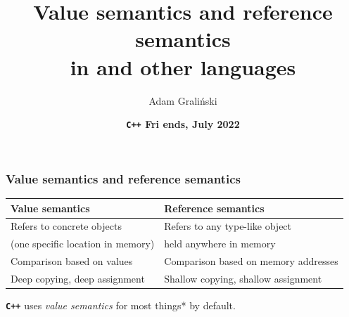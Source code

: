 \documentclass[aspectratio=169]{beamer}
\title[Friends\#21 :: \cpp{ValueAndReferenceSemantics}]{Value semantics and reference semantics\\
in \cpp{C++} and other languages
}
\author{Adam Graliński}
\date[July'22]{\textbf{\texttt{\color[HTML]{d33682}C++} {\color[HTML]{268bd2}F}{\color[HTML]{2aa198}r}{\color[HTML]{859900}i}%
{\color[HTML]{cb4b16}e}{\color[HTML]{dc322f}n}{\color[HTML]{6c71c4}d}{\color[HTML]{b58900}s}, July 2022}}
\newcommand{\greenemph}[1]{\textit{\textcolor{clGreen}{#1}}}
\newcommand{\cpp}[1]{\texttt{\textbf{\textcolor{clCodeBlue}{#1}}}}
\begin{document}
{
\begin{frame}
\titlepage{}
\end{frame}
}

\begin{frame}
\frametitle{Value semantics and reference semantics}
\begin{center}
  \begin{tabular}{m{6cm} | m{7cm}}
    \textbf{Value semantics} & \textbf{Reference semantics}\\
    \hline{}
    Refers to concrete objects          & Refers to any type-like object\\
    (one specific location in memory)   & held anywhere in memory\\
    \hline{}
    Comparison based on values          & Comparison based on memory addresses\\
    \hline{}
    Deep copying, deep assignment       & Shallow copying, shallow assignment\\
  \end{tabular}
\end{center}
\cpp{C++} uses \greenemph{value semantics} for most things* by default.
\end{frame}
\end{document}

